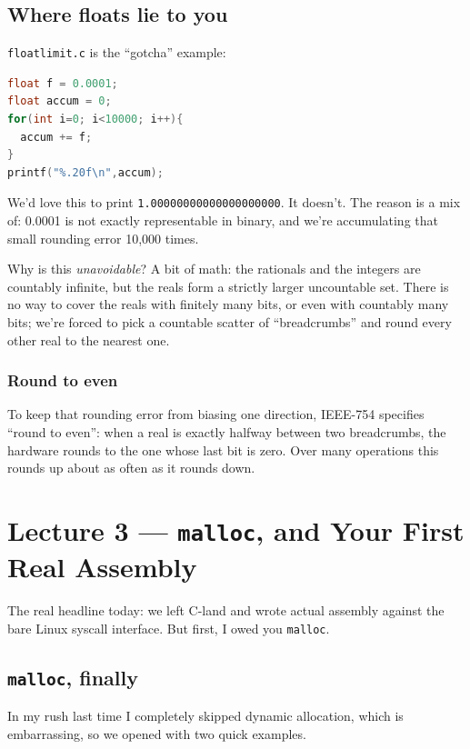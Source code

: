 \documentclass[11pt]{article}
\begin{document}
\subsection*{Where floats lie to you}

\texttt{floatlimit.c} is the ``gotcha'' example:

\begin{lstlisting}[language=C]
float f = 0.0001;
float accum = 0;
for(int i=0; i<10000; i++){
  accum += f;
}
printf("%.20f\n",accum);
\end{lstlisting}

We'd love this to print \texttt{1.00000000000000000000}. It doesn't.
The reason is a mix of: 0.0001 is not exactly representable in binary,
and we're accumulating that small rounding error 10{,}000 times.

Why is this \emph{unavoidable}? A bit of math: the rationals and the
integers are countably infinite, but the reals form a strictly larger
uncountable set. There is no way to cover the reals with finitely many
bits, or even with countably many bits; we're forced to pick a
countable scatter of ``breadcrumbs'' and round every other real to the
nearest one.

\subsubsection*{Round to even}

To keep that rounding error from biasing one direction, IEEE-754
specifies ``round to even'': when a real is exactly halfway between
two breadcrumbs, the hardware rounds to the one whose last bit is
zero. Over many operations this rounds up about as often as it rounds
down.

\section{Lecture 3 --- \texttt{malloc}, and Your First Real Assembly}

The real headline today: we left C-land and wrote actual assembly
against the bare Linux syscall interface. But first, I owed you
\texttt{malloc}.

\subsection*{\texttt{malloc}, finally}

In my rush last time I completely skipped dynamic allocation, which is
embarrassing, so we opened with two quick examples.
\end{document}
